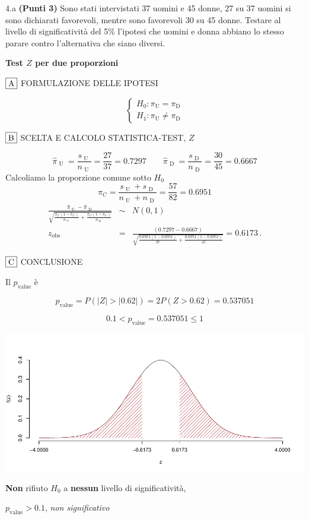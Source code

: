 \documentclass[
  11pt,
]{book}
\theoremstyle{mytheoremstyle}
\theoremstyle{mydefstyle}
\newenvironment{sol}
  {
  \begin{tcolorbox}[enhanced,breakable,arc=0.1mm,boxrule=1pt,colback=white,colframe=iblue,
  title=\bf \fontfamily{lmss}\selectfont \hspace{.5 cm} Soluzione,drop fuzzy shadow]

}{
\end{tcolorbox}
  }
\begin{document}
4.a \textbf{(Punti 3)} Sono stati intervistati 37 uomini e 45 donne,
27 su 37 uomini si sono dichiarati favorevoli, mentre sono favorevoli
30 su 45 donne. Testare al livello di significatività del 5\% l'ipotesi
che uomini e donna abbiano lo stesso parare contro l'alternativa che siano
diversi.

\begin{sol}
\textbf{Test \(Z\) per due proporzioni}

\(\fbox{A}\) FORMULAZIONE DELLE IPOTESI

\[\begin{cases}
   H_0: \pi_\text{U} = \pi_\text{D} \\
   H_1: \pi_\text{U} \neq \pi_\text{D} 
   \end{cases}\]

\(\fbox{B}\) SCELTA E CALCOLO STATISTICA-TEST, \(Z\)

\[\hat\pi_\text{ U }=\frac{s_\text{ U }}{n_\text{ U }}=\frac{ 27 }{ 37 }= 0.7297 \qquad
   \hat\pi_\text{ D }=\frac{s_\text{ D }}{n_\text{ D }}=\frac{ 30 }{ 45 }= 0.6667 \]Calcoliamo la proporzione comune sotto \(H_0\)
\[
     \pi_C=\frac{s_\text{ U }+s_\text{ D }}{n_\text{ U }+n_\text{ D }}=
     \frac{ 57 }{ 82 }= 0.6951 
   \]\begin{eqnarray*}
   \frac{\hat\pi_\text{ U } - \hat\pi_\text{ D }}
   {\sqrt{\frac {\pi_C(1-\pi_C)}{n_\text{ U }}+\frac {\pi_C(1-\pi_C)}{n_\text{ D }}}}&\sim&N(0,1)\\
   z_{\text{obs}}
   &=& \frac{ ( 0.7297 -  0.6667 )} {\sqrt{\frac{ 0.6951 (1- 0.6951 )}{ 37 }+\frac{ 0.6951 (1- 0.6951 )}{ 45 }}}
   =   0.6173 \, .
   \end{eqnarray*}

\(\fbox{C}\) CONCLUSIONE

Il \(p_{\text{value}}\) è

\[ p_{\text{value}} = P(|Z|>|0.62|)=2P(Z>0.62)=0.537051 \]

\[
 0.1 < p_\text{value}= 0.537051 \leq 1 
\]

\begin{center}\includegraphics{Appunti_di_Statistica_2025_files/figure-latex/unnamed-chunk-19-1} \end{center}

\textbf{Non} rifiuto \(H_0\) a \textbf{nessun}
livello di significatività,

\(p_\text{value}>0.1\),
\emph{non significativo}

\end{sol}
\end{document}
